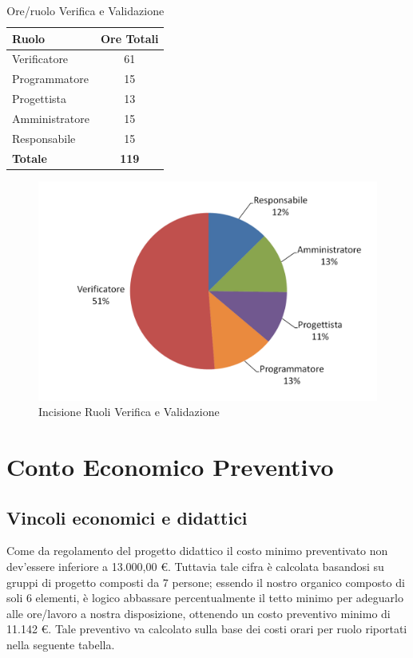 \documentclass[a4paper,11pt]{article}
\begin{document}
		\begin{table}[h!]			
		\begin{center}
			\begin{tabular}{l c}
			\textbf{Ruolo} & \textbf{Ore Totali} \\
			\midrule
			Verificatore & 61\\
			Programmatore & 15 \\
			Progettista & 13 \\
			Amministratore & 15 \\
			Responsabile & 15\\
			\midrule
			\textbf{Totale} & \textbf{119}\\
			\end{tabular}
		\end{center}
		\caption{Ore/ruolo Verifica e Validazione}
		\end{table}
		
		\begin{figure}[h!]
		    \centering
			\includegraphics[scale=0.6]{../Images/pie_chart-V&V}
			\caption{Incisione Ruoli Verifica e Validazione}
		\end{figure}
		
	\newpage
	\section{Conto Economico Preventivo}
	\subsection{Vincoli economici e didattici}
	Come da regolamento del progetto didattico il costo minimo preventivato non dev'essere inferiore a 13.000,00 \euro. Tuttavia tale cifra è calcolata basandosi su gruppi di progetto composti da 7 persone; essendo il nostro organico composto di soli 6 elementi, è logico abbassare percentualmente il tetto minimo per adeguarlo alle ore/lavoro a nostra disposizione, ottenendo un costo preventivo minimo di 11.142 \euro. Tale preventivo va calcolato sulla base dei costi orari per ruolo riportati nella seguente tabella.
\end{document}
